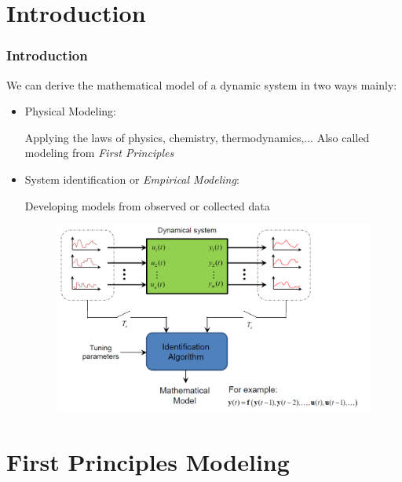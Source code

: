 \section{Introduction}
\begin{frame}
\frametitle{Introduction}
We can derive the mathematical model of a dynamic system in two ways mainly:
\begin{itemize}
	\item Physical Modeling: 
	
	Applying the laws of physics, chemistry, thermodynamics,...
	Also called modeling from \emph{First Principles}
	
	\pause 
	
	\item  System identification or \emph{Empirical Modeling}:
	
	Developing models from observed or collected data
	\begin{figure}
	\centering
	\includegraphics[width=0.7\linewidth]{img/system-identification}
	\label{fig:system-identification}
	\end{figure}

\end{itemize}
\end{frame}


\section{First Principles Modeling}


